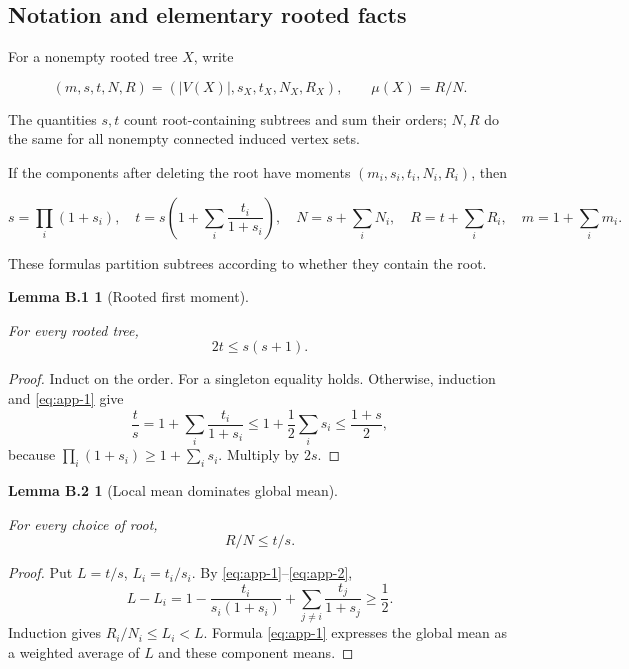 \documentclass[11pt,letterpaper]{article}
\theoremstyle{plain}
\newtheorem*{applemmaone}{Lemma B.1}
\newtheorem*{applemmatwo}{Lemma B.2}
\begin{document}
\subsection{Notation and elementary rooted facts}\label{b.1.-notation-and-elementary-rooted-facts}

For a nonempty rooted tree \(X\), write

\[
(m,s,t,N,R)=(|V(X)|,s_X,t_X,N_X,R_X),\qquad \mu(X)=R/N.
\]

The quantities \(s,t\) count root-containing subtrees and sum their orders; \(N,R\) do the same for all nonempty connected induced vertex sets.

If the components after deleting the root have moments \((m_i,s_i,t_i,N_i,R_i)\), then

\[
s=\prod_i(1+s_i),\quad
 t=s\left(1+\sum_i\frac{t_i}{1+s_i}\right),\quad
 N=s+\sum_iN_i,\quad R=t+\sum_iR_i,\quad m=1+\sum_i m_i.
\tag{B.1}\label{eq:app-1}
\]

These formulas partition subtrees according to whether they contain the root.

\begin{applemmaone}[Rooted first moment]\label{lem:app-1}

For every rooted tree, \[
2t\le s(s+1).
\tag{B.2}\label{eq:app-2}
\]

\end{applemmaone}

\begin{proof} Induct on the order. For a singleton equality holds. Otherwise, induction and \eqref{eq:app-1} give \[
\frac ts=1+\sum_i\frac{t_i}{1+s_i}
\le1+\frac12\sum_i s_i
\le\frac{1+s}{2},
\] because \(\prod_i(1+s_i)\ge1+\sum_i s_i\). Multiply by \(2s\). \end{proof}

\begin{applemmatwo}[Local mean dominates global mean]\label{lem:app-2}

For every choice of root, \[
R/N\le t/s.
\tag{B.3}\label{eq:app-3}
\]

\end{applemmatwo}

\begin{proof} Put \(L=t/s\), \(L_i=t_i/s_i\). By \eqref{eq:app-1}--\eqref{eq:app-2}, \[
L-L_i
=1-\frac{t_i}{s_i(1+s_i)}
 +\sum_{j\ne i}\frac{t_j}{1+s_j}\ge\frac12.
\] Induction gives \(R_i/N_i\le L_i<L\). Formula \eqref{eq:app-1} expresses the global mean as a weighted average of \(L\) and these component means. \end{proof}
\end{document}
